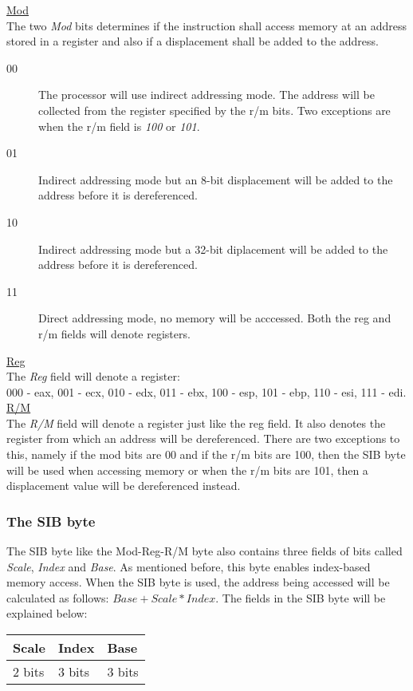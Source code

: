 \documentclass[11pt,twoside]{eitExjobb}
\begin{document}
\noindent \uline{Mod}\\
The two \emph{Mod} bits determines if the instruction shall access memory at an address stored in a register and also if a displacement shall be added to the address.\\
\begin{description}
\item[00] The processor will use indirect addressing mode. The address will be collected from the register specified by the r/m bits. Two exceptions are when the r/m field is \emph{100} or \emph{101}.  
\item[01] Indirect addressing mode but an 8-bit displacement will be added to the address before it is dereferenced.
\item[10] Indirect addressing mode but a 32-bit diplacement will be added to the address before it is dereferenced.
\item[11] Direct addressing mode, no memory will be acccessed. Both the reg and r/m fields will denote registers.
\end{description}

\noindent \uline{Reg}\\
The \emph{Reg} field will denote a register: \\ 000 - eax, 001 - ecx, 010 - edx, 011 - ebx, 100 - esp, 101 - ebp, 110 - esi, 111 - edi.\\


\noindent \uline{R/M}\\
The \emph{R/M} field will denote a register just like the reg field. It also denotes the register from which an address will be dereferenced. There are two exceptions to this, namely if the mod bits are 00 and if the r/m bits are 100, then the SIB byte will be used when accessing memory or when the r/m bits are 101, then a displacement value will be dereferenced instead.

\subsubsection{The SIB byte}
The SIB byte like the Mod-Reg-R/M byte also contains three fields of bits called \emph{Scale}, \emph{Index} and \emph{Base}. As mentioned before, this byte enables index-based memory access. When the SIB byte is used, the address being accessed will be calculated as follows:
$Base + Scale*Index$. The fields in the SIB byte will be explained below:\\

\begin{tabular}{|l|l|l|}
\hline
Scale & Index & Base \\
\hline
2 bits & 3 bits & 3 bits \\
\hline
\end{tabular}
\\\\
\end{document}
